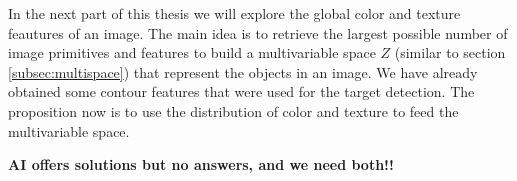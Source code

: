 
In the next part of this thesis we will explore the global color and texture feautures of an image. The main idea is to retrieve the largest possible number of image primitives and features to build a multivariable space $Z$ (similar to section \ref{subsec:multispace}) that represent the objects in an image. We have already obtained some contour features that were used for the target detection. The proposition now is to use the distribution of color and texture to feed the multivariable space. 


\textbf{AI offers solutions but no answers, and we need both!!}